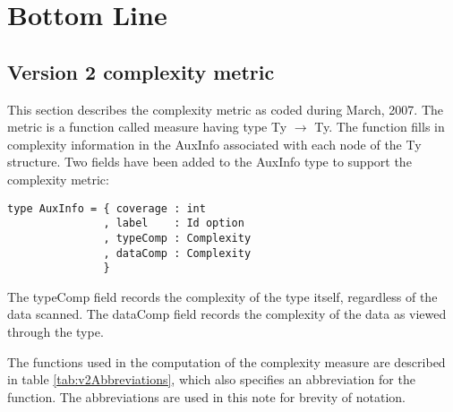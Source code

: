 \newpage
\section{Bottom Line}
\label{sec:BottomLine}

\subsection{Version 2 complexity metric}

This section describes the complexity metric as coded during March,
2007. The metric is a function called \textsf{measure} having type
\textsf{Ty} $\rightarrow$ \textsf{Ty}. The function fills in complexity
information in the \textsf{AuxInfo} associated with each node of the
\textsf{Ty} structure. Two fields have been added to the \textsf{AuxInfo} type
to support the complexity metric:

\begin{verbatim}
type AuxInfo = { coverage : int
               , label    : Id option
               , typeComp : Complexity
               , dataComp : Complexity
               }
\end{verbatim}

The \textsf{typeComp} field records the complexity of the type itself,
regardless of the data scanned. The \textsf{dataComp} field records
the complexity of the data as viewed through the type.

The functions used in the computation of the complexity measure are
described in table \ref{tab:v2Abbreviations}, which also specifies an
abbreviation for the function. The abbreviations are used in this note
for brevity of notation.

